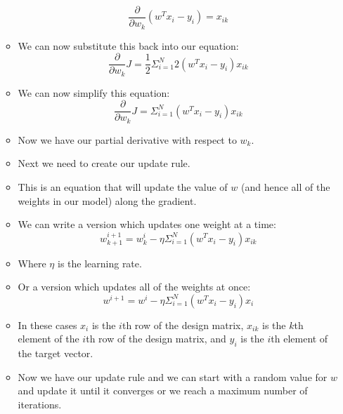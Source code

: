 \documentclass[12pt]{article}
\begin{document}
\begin{itemize}
\begin{itemize}
                            \begin{equation}
                                \frac{\partial}{\partial w_k} ({w^T}x_i - y_i) = x_{ik}
                            \end{equation}
                            \item We can now substitute this back into our equation:
                            \begin{equation}
                                \frac{\partial}{\partial w_k} J = \frac{1}{2} \Sigma_{i=1}^N 2({w^T}x_i - y_i) x_{ik}
                            \end{equation}
                            \item We can now simplify this equation:
                            \begin{equation}
                                \frac{\partial}{\partial w_k} J = \Sigma_{i=1}^N ({w^T}x_i - y_i) x_{ik}
                            \end{equation}
                            \item Now we have our partial derivative with respect to $w_k$.
                            \item Next we need to create our update rule.
                            \item This is an equation that will update the value of $w$ (and hence all of the weights in our model) along the gradient.
                            \item We can write a version which updates one weight at a time:
                            \begin{equation}
                                w_{k+1}^{i+1} = w_k^i - \eta \Sigma_{i=1}^N ({w^T}x_i - y_i) x_{ik}
                            \end{equation}
                            \item Where $\eta$ is the learning rate.
                            \item Or a version which updates all of the weights at once:
                            \begin{equation}
                                w^{i+1} = w^i - \eta \Sigma_{i=1}^N ({w^T}x_i - y_i) x_i
                            \end{equation}
                            \item In these cases $x_i$ is the $i$th row of the design matrix, $x_{ik}$ is the $k$th element of the $i$th row of the design matrix, and $y_i$ is the $i$th element of the target vector.
                            \item Now we have our update rule and we can start with a random value for $w$ and update it until it converges or we reach a maximum number of iterations.
                        \end{itemize}
                \end{itemize}
\end{document}
